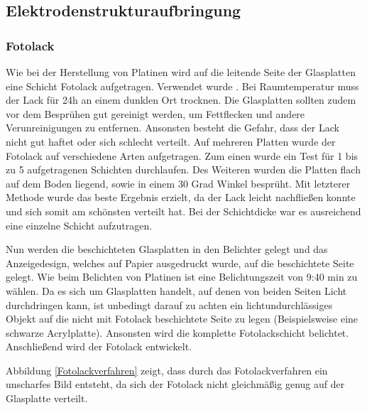 \subsection{Elektrodenstrukturaufbringung}


\subsubsection*{Fotolack}

Wie bei der Herstellung von Platinen wird auf die leitende Seite der Glasplatten eine Schicht Fotolack aufgetragen. Verwendet wurde \cite[\textit{POSITIV 20 Lichtemfpindlicher Lack}]{Fotolack}.
Bei Raumtemperatur muss der Lack für 24h an einem dunklen Ort trocknen. Die Glasplatten sollten zudem vor dem Besprühen gut gereinigt werden, um Fettflecken und andere Verunreinigungen zu entfernen. Ansonsten besteht die Gefahr, dass der Lack nicht gut haftet oder sich schlecht verteilt.
Auf mehreren Platten wurde der Fotolack auf verschiedene Arten aufgetragen. Zum einen wurde ein Test für 1 bis zu 5 aufgetragenen Schichten durchlaufen. Des Weiteren wurden die Platten flach auf dem Boden liegend, sowie in einem 30 Grad Winkel besprüht.
Mit letzterer Methode wurde das beste Ergebnis erzielt, da der Lack leicht nachfließen konnte und sich somit am schönsten verteilt hat. Bei der Schichtdicke war es ausreichend eine einzelne Schicht aufzutragen.

Nun werden die beschichteten Glasplatten in den Belichter gelegt und das Anzeigedesign, welches auf Papier ausgedruckt wurde, auf die beschichtete Seite gelegt. Wie beim Belichten von Platinen ist eine Belichtungszeit von 9:40 min zu wählen. Da es sich um Glasplatten handelt, auf denen von beiden Seiten Licht durchdringen kann, ist unbedingt darauf zu achten ein lichtundurchlässiges Objekt auf die nicht mit Fotolack beschichtete Seite zu legen (Beispielsweise eine schwarze Acrylplatte). Ansonsten wird die komplette Fotolackschicht belichtet. Anschließend wird der Fotolack entwickelt. %

Abbildung \ref{Fotolackverfahren} zeigt, dass durch das Fotolackverfahren ein unscharfes Bild entsteht, da sich der Fotolack nicht gleichmäßig genug auf der Glasplatte verteilt.\\

